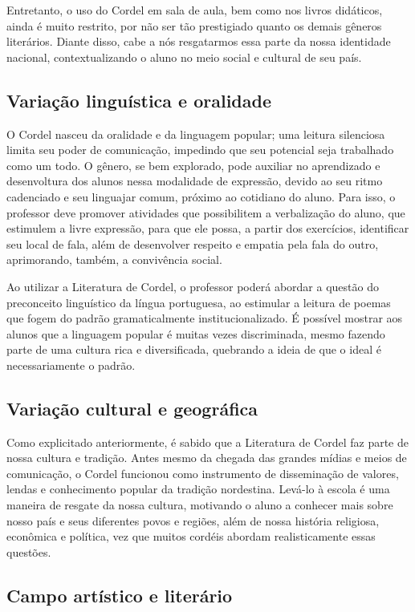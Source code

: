\documentclass[12pt]{extarticle}
\begin{document}
Entretanto, o uso do Cordel em sala de aula, bem como nos livros didáticos,
ainda é muito restrito, por não ser tão prestigiado quanto os demais gêneros
literários. Diante disso, cabe a nós resgatarmos essa parte da nossa identidade
nacional, contextualizando o aluno no meio social e cultural de seu país.

\subsection{Variação linguística e oralidade}

O Cordel nasceu da oralidade e da linguagem popular; uma leitura silenciosa
limita seu poder de comunicação, impedindo que seu potencial seja trabalhado
como um todo. O gênero, se bem explorado, pode auxiliar no aprendizado
e desenvoltura dos alunos nessa modalidade de expressão, devido ao seu ritmo
cadenciado e seu linguajar comum, próximo ao cotidiano do aluno. Para isso,
o professor deve promover atividades que possibilitem a verbalização do aluno,
que estimulem a livre expressão, para que ele possa, a partir dos exercícios,
identificar seu local de fala, além de desenvolver respeito e empatia pela fala
do outro, aprimorando, também, a convivência social.

Ao utilizar a Literatura de Cordel, o professor poderá abordar a questão do
preconceito linguístico da língua portuguesa, ao estimular a leitura de poemas
que fogem do padrão gramaticalmente institucionalizado. É possível mostrar aos
alunos que a linguagem popular é muitas vezes discriminada, mesmo fazendo parte
de uma cultura rica e diversificada, quebrando a ideia de que o ideal
é necessariamente o padrão.

\subsection{Variação cultural e geográfica}

Como explicitado anteriormente, é sabido que a Literatura de Cordel faz parte
de nossa cultura e tradição. Antes mesmo da chegada das grandes mídias e meios
de comunicação, o Cordel funcionou como instrumento de disseminação de valores,
lendas e conhecimento popular da tradição nordestina. Levá-lo à escola é uma
maneira de resgate da nossa cultura, motivando o aluno a conhecer mais sobre
nosso país e seus diferentes povos e regiões, além de nossa história religiosa,
econômica e política, vez que muitos cordéis abordam realisticamente essas
questões.

\subsection{Campo artístico e literário}
\end{document}

